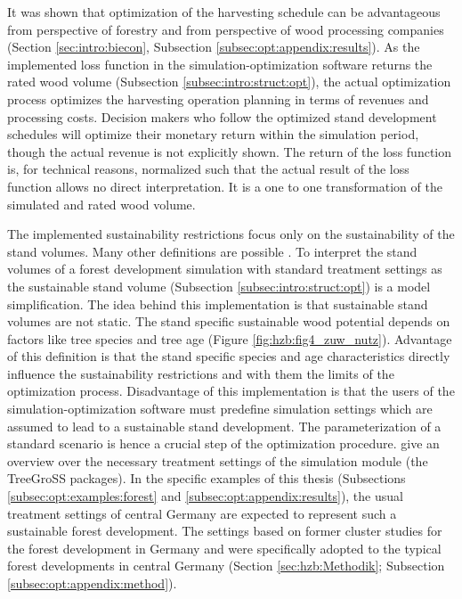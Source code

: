 It was shown that optimization of the harvesting schedule can be advantageous from perspective of forestry and from perspective of wood processing companies (Section \ref{sec:intro:biecon}, Subsection \ref{subsec:opt:appendix:results}). As the implemented loss function in the simulation-optimization software returns the rated wood volume (Subsection \ref{subsec:intro:struct:opt}), the actual optimization process optimizes the harvesting operation planning in terms of revenues and processing costs. Decision makers who follow the optimized stand development schedules will optimize their monetary return within the simulation period, though the actual revenue is not explicitly shown. The return of the loss function is, for technical reasons, normalized such that the actual result of the loss function allows no direct interpretation. It is a one to one transformation of the simulated and rated wood volume.

The implemented sustainability restrictions focus only on the sustainability of the stand volumes. Many other definitions are possible \citep[p. 102]{spellmann_2010}. To interpret the stand volumes of a forest development simulation with standard treatment settings as the sustainable stand volume (Subsection \ref{subsec:intro:struct:opt}) is a model simplification. The idea behind this implementation is that sustainable stand volumes are not static. The stand specific sustainable wood potential depends on factors like tree species and tree age (Figure \ref{fig:hzb:fig4_zuw_nutz}). Advantage of this definition is that the stand specific species and age characteristics directly influence the sustainability restrictions and with them the limits of the optimization process. Disadvantage of this implementation is that the users of the simulation-optimization software must predefine simulation settings which are assumed to lead to a sustainable stand development. The parameterization of a standard scenario is hence a crucial step of the optimization procedure. \citet[p. 90]{hansen_2014} give an overview over the necessary treatment settings of the simulation module (the TreeGroSS packages). In the specific examples of this thesis (Subsections \ref{subsec:opt:examples:forest} and \ref{subsec:opt:appendix:results}), the usual treatment settings of central Germany are expected to represent such a sustainable forest development. The settings based on former cluster studies for the forest development in Germany and were specifically adopted to the typical forest developments in central Germany (Section \ref{sec:hzb:Methodik}; Subsection \ref{subsec:opt:appendix:method}).

